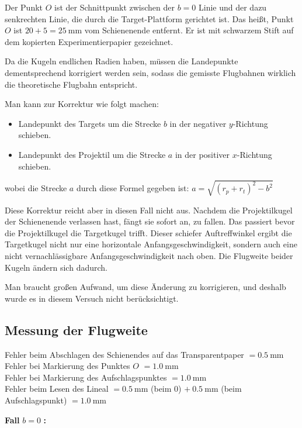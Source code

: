 \documentclass[twoside]{article}
\begin{document}
    Der Punkt $O$ ist der Schnittpunkt zwischen der $b = 0$ Linie und der dazu senkrechten Linie, die durch die Target-Plattform gerichtet ist. Das heißt, Punkt $O$ ist $20 + 5 = \SI{25}{\milli\meter}$ vom Schienenende entfernt. Er ist mit schwarzem Stift auf dem kopierten Experimentierpapier gezeichnet. 

    Da die Kugeln endlichen Radien haben, müssen die Landepunkte dementsprechend korrigiert werden sein, sodass die gemisste Flugbahnen wirklich die theoretische Flugbahn entspricht. 

    Man kann zur Korrektur wie folgt machen:
    \begin{itemize}
        \item Landepunkt des Targets um die Strecke $b$ in der negativer $y$-Richtung schieben.
        \item Landepunkt des Projektil um die Strecke $a$ in der positiver $x$-Richtung schieben.
    \end{itemize}
    wobei die Strecke $a$ durch diese Formel gegeben ist: $a = \sqrt{\left(r_p + r_t\right)^2 - b^2}$

    Diese Korrektur reicht aber in diesen Fall nicht aus. Nachdem die Projektilkugel der Schienenende verlassen hast, fängt sie sofort an, zu fallen. Das passiert bevor die Projektilkugel die Targetkugel trifft. Dieser schiefer Auftreffwinkel ergibt die Targetkugel nicht nur eine horizontale Anfangsgeschwindigkeit, sondern auch eine nicht vernachlässigbare Anfangsgeschwindigkeit nach oben. Die Flugweite beider Kugeln ändern sich dadurch. 

    Man braucht großen Aufwand, um diese Änderung zu korrigieren, und deshalb wurde es in diesem Versuch nicht berücksichtigt. 

    \subsection{Messung der Flugweite}
        Fehler beim Abschlagen des Schienendes auf das Transparentpaper $= \SI{0.5}{\milli\meter}$\\
        Fehler bei Markierung des Punktes $O$ $ = \SI{1,0}{\milli\meter}$ \\
        Fehler bei Markierung des Aufschlagspunktes $= \SI{1.0}{\milli\meter}$\\
        Fehler beim Lesen des Lineal $= \SI{0.5}{\milli\meter}$ (beim 0) $+ ~\SI{0.5}{\milli\meter}$ (beim Aufschlagspunkt) $ = \SI{1,0}{\milli\meter}$

        \textbf{Fall} $b = 0$ \textbf{:}
\end{document}
